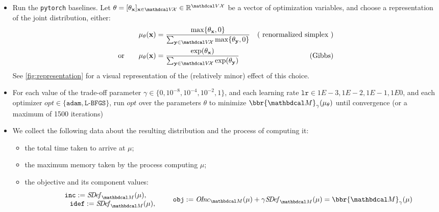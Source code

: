 \begin{subappendices}
\begin{itemize}
    \item Run the \texttt{pytorch} baselines.
    Let $\theta = [\theta_{\mat x}]_{\mat x \in \V\!\X} \in \mathbb R^{\V\X}$ be a vector of optimization variables, and choose a representation of the joint distribution, either:
    \begin{align*}
        \mu_{\theta}(\mat x) &= \frac{\max\{\theta_{\mat x}, 0\} }
            {\sum_{\mat y \in \V\!\X}\max\{\theta_{\mat y}, 0\} }
        &(\text{ renormalized simplex }) \\
    \text{or}\qquad
    \mu_{\theta}(\mat x) &= \frac{\exp(\theta_{\mat x})}{\sum_{\mat y \in \V\!\X} \exp(\theta_{\mat y})} & (\text{Gibbs})
    \end{align*}
    See \cref{fig:representation} for a visual representation of the (relatively minor) effect of this choice. 
    \item
    For each value of the trade-off parameter 
    $\gamma \in \{0, 10^{-8}, 10^{-4}, 10^{-2}, 1\}$, and each learning rate $\texttt{lr} \in 1E-3, 1E-2, 1E-1, 1E0$, and each optimizer $\mathit{opt} \in \{\texttt{adam}, \texttt{L-BFGS}\}$,
    run $\mathit{opt}$ over the parameters $\theta$ to minimize $\bbr{\dg M}_\gamma(\mu_{\theta})$
     until convergence (or a maximum of 1500 iterations)

     \item We collect the following data about the resulting distribution and the process of computing it:
     \begin{itemize}[nosep]
         \item the total time taken to arrive at $\mu$;
         \item the maximum memory taken by the process computing $\mu$;
         \item the objective and its component values:
         \vspace{-1ex}
         \[
            \begin{array}{c}
            \texttt{inc} := \SDef_{\dg M}(\mu), \\
            \qquad \texttt{idef} := \SDef_{\dg M}(\mu),
            \end{array}
            \qquad \texttt{obj} := \OInc_{\dg M}(\mu) + \gamma \SDef_{\dg M}(\mu) = \bbr{\dg M}_\gamma(\mu)
        \]
     \end{itemize}
\end{itemize}




\end{subappendices}
